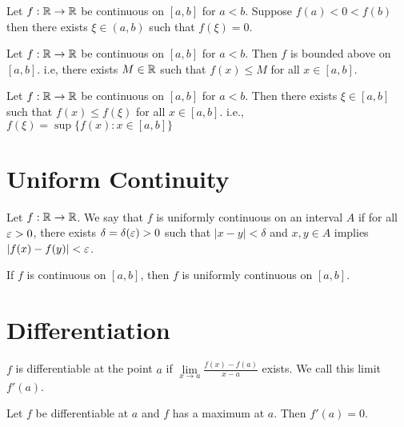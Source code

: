 \begin{theorem*}
  Let $f : \mathbb R \to \mathbb R$ be continuous on $[a, b]$ for $a < b$. Suppose $f(a) < 0 < f(b)$ then there exists $\xi \in (a, b)$ such that $f(\xi) = 0$.
\end{theorem*}

\begin{theorem*}
  Let $f : \mathbb R \to \mathbb R$ be continuous on $[a, b]$ for $a < b$. Then $f$ is bounded above on $[a, b]$.
  i.e, there exists $M \in \mathbb R$ such that $f(x) \le M$ for all $x \in [a, b]$.
\end{theorem*}

\begin{theorem*}
  Let $f : \mathbb R \to \mathbb R$ be continuous on $[a, b]$ for $a < b$. Then there exists $\xi \in [a, b]$ such that $f(x) \le f(\xi)$ for all $x \in [a, b]$.
  i.e., $f(\xi) = \sup \{f(x) : x \in [a, b]\}$
\end{theorem*}

\section{Uniform Continuity}

\begin{definition*}
  Let $f : \mathbb R \to \mathbb R$.
  We say that $f$ is uniformly continuous on an interval $A$ if for all $\varepsilon > 0$, there exists $\delta = \delta(\varepsilon) > 0$ such that
  $|x-y| < \delta$ and $x, y \in A$ implies $|f(x)-f(y)| < \varepsilon$.
\end{definition*}

\begin{theorem*}
  If $f$ is continuous on $[a, b]$, then $f$ is uniformly continuous on $[a, b]$.
\end{theorem*}

\section{Differentiation}

\begin{definition*}
  $f$ is differentiable at the point $a$ if $\lim\limits_{x \to a} \frac{f(x)-f(a)}{x-a}$ exists. We call this limit $f'(a)$.
\end{definition*}

\begin{theorem*}
  Let $f$ be differentiable at $a$ and $f$ has a maximum at $a$. Then $f'(a) = 0$. 
\end{theorem*}

